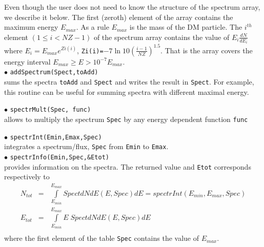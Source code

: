 \documentclass[12pt,a4paper]{article}
\begin{document}
Even though the user does not need to know the structure of the  spectrum array, we describe it below.
The first (zeroth) element of the array contains the maximum energy $E_{max}$. As a rule   $E_{max}$ is the mass of the DM particle.    
The $i^{th}$ element $(1\le i < NZ-1)$ of the spectrum array contains
the value of $E_i \frac{ dN}{dE_i} $ where  $E_i=E_{max} e^{Zi(i)}$,   
\verb|Zi(i)=|$ -7 \ln 10 \left(\frac{i-1}{NZ}\right)^{1.5}$.
 That is the array  covers the  energy interval  $E_{max} \ge E > 10^{-7}E_{max}$. \\

\noindent
$\bullet$ \verb|addSpectrum(Spect,toAdd)|\\
sums the  spectra \verb|toAdd|  and \verb|Spect| and writes the result in \verb|Spect|. For example, this routine can be useful for summing spectra 
with different  maximal energy.


\noindent
$\bullet$ \verb|spectrMult(Spec, func)|\\
allows to multiply the spectrum \verb|Spec| by any energy dependent function \verb|func|

\noindent
$\bullet$ \verb|spectrInt(Emin,Emax,Spec) | \\
integrates a spectrum/flux, \verb|Spec| from {\tt Emin} to  {\tt Emax}.\\
\noindent
$\bullet$ \verb|spectrInfo(Emin,Spec,&Etot)|\\
provides information on the spectra. The  returned value and \verb|Etot| corresponds respectively to   
\begin{eqnarray}
\nonumber
  N_{tot}&=&\int \limits_{E_{min}}^{E_{max}} SpectdNdE(E,Spec) dE = spectrInt(E_{min},E_{max},Spec) \\ 
\nonumber
  E_{tot}&=&  \int \limits_{E_{min}}^{E_{max}} E\; SpectdNdE(E,Spec)dE\\
\nonumber
 \end{eqnarray}
where the first element of the table {\tt Spec} contains the value of   $E_{max}$.
\end{document}
